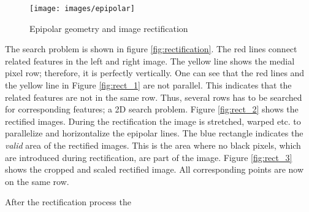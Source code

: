 \documentclass[11pt]{article}
\begin{document}
 \begin{figure}[H]
        \centering
        \texttt{[image: images/epipolar]}
        \caption{Epipolar geometry and image rectification\protect\footnotemark}
        \label{fig:epipolar}
\end{figure}

The search problem is shown in figure \ref{fig:rectification}. The red lines connect related features in the left and right image. The yellow line shows the medial pixel row; therefore, it is perfectly vertically. One can see that the red lines and the yellow line in Figure \ref{fig:rect_1} are not parallel. This indicates that the related features are not in the same row. Thus, several rows has to be searched for corresponding features; a 2D search problem. Figure \ref{fig:rect_2} shows the rectified images. During the rectification the image is stretched, warped etc. to parallelize and horizontalize the epipolar lines. The blue rectangle indicates the \emph{valid} area of the rectified images. This is the area where no black pixels, which are introduced during rectification, are part of the image. Figure \ref{fig:rect_3} shows the cropped and scaled rectified image. All corresponding points are now on the same row.

After the rectification process the 
\end{document}
